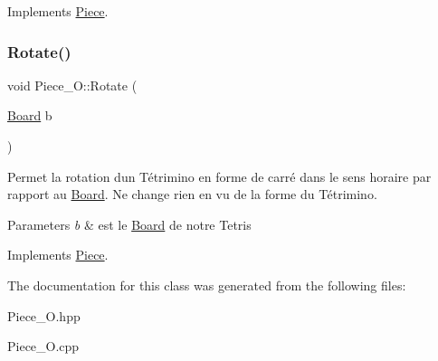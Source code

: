 Implements \hyperlink{classPiece_a56cdf7f4234fe848a3e203b693b7a862}{Piece}.

\mbox{\label{classPiece__O_a69812f938582f176cd4cca997cbb87c1}} 
\subsubsection{\texorpdfstring{Rotate()}{Rotate()}}
{\footnotesize\ttfamily void Piece\+\_\+\+O\+::\+Rotate (\begin{DoxyParamCaption}\item[{\hyperlink{classBoard}{Board}}]{b }\end{DoxyParamCaption})\hspace{0.3cm}{\ttfamily [virtual]}}



Permet la rotation d\textquotesingle{}un Tétrimino en forme de carré dans le sens horaire par rapport au \hyperlink{classBoard}{Board}. Ne change rien en vu de la forme du Tétrimino. 


\begin{DoxyParams}{Parameters}
{\em b} & est le \hyperlink{classBoard}{Board} de notre Tetris \\
\hline
\end{DoxyParams}


Implements \hyperlink{classPiece_a078f3cc6281cb8f60af3ae2266c651ba}{Piece}.



The documentation for this class was generated from the following files\+:\begin{DoxyCompactItemize}
\item 
Piece\+\_\+\+O.\+hpp\item 
Piece\+\_\+\+O.\+cpp\end{DoxyCompactItemize}
